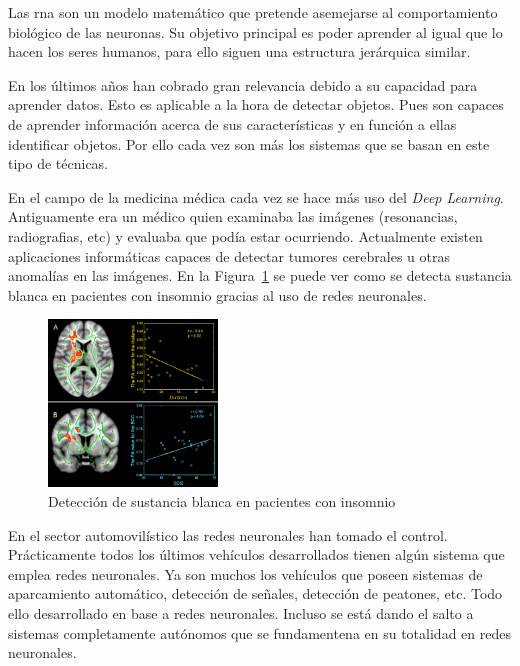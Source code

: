 Las \acrfull{rna} son un modelo matemático que pretende asemejarse al comportamiento biológico de las neuronas. Su objetivo principal es poder aprender al igual que lo hacen los seres humanos, para ello siguen una estructura jerárquica similar.

En los últimos años han cobrado gran relevancia debido a su capacidad para aprender datos. Esto es aplicable a la hora de detectar objetos. Pues son capaces de aprender información acerca de sus características y en función a ellas identificar objetos. Por ello cada vez son más los sistemas que se basan en este tipo de técnicas. 

En el campo de la medicina médica cada vez se hace más uso del \textit{Deep Learning}. Antiguamente era un médico quien examinaba las imágenes (resonancias, radiografias, etc) y evaluaba que podía estar ocurriendo. Actualmente existen aplicaciones informáticas capaces de detectar tumores cerebrales u otras anomalías en las imágenes. En la Figura~\ref{fig.imagen_medica} se puede ver como se detecta sustancia blanca en pacientes con insomnio gracias al uso de redes neuronales.

\begin{figure}[H]
  \begin{center}
    \includegraphics[width=0.4\textwidth]{figures/Introduccion/imagen_medica.jpg}
		\caption{Detección de sustancia blanca en pacientes con insomnio}
		\label{fig.imagen_medica}
		\end{center}
\end{figure}

En el sector automovilístico las redes neuronales han tomado el control. Prácticamente todos los últimos vehículos desarrollados tienen algún sistema que emplea redes neuronales. Ya son muchos los vehículos que poseen sistemas de aparcamiento automático, detección de señales, detección de peatones, etc. Todo ello desarrollado en base a redes neuronales. Incluso se está dando el salto a sistemas completamente autónomos que se fundamentena en su totalidad en redes neuronales.

